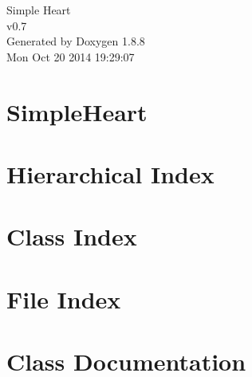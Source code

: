\documentclass[twoside]{book}
\newcommand{\+}{\discretionary{\mbox{\scriptsize$\hookleftarrow$}}{}{}}
\newcommand{\clearemptydoublepage}{%
  \newpage{\pagestyle{empty}\cleardoublepage}%
}
\begin{document}
\hypersetup{pageanchor=false,
             bookmarks=true,
             bookmarksnumbered=true,
             pdfencoding=unicode
            }
\begin{titlepage}
\vspace*{7cm}
\begin{center}%
{\Large Simple Heart \\[1ex]\large v0.\+7 }\\
\vspace*{1cm}
{\large Generated by Doxygen 1.8.8}\\
\vspace*{0.5cm}
{\small Mon Oct 20 2014 19:29:07}\\
\end{center}
\end{titlepage}
\clearemptydoublepage
\tableofcontents
\clearemptydoublepage
{}
\hypersetup{pageanchor=true}

\chapter{Simple\+Heart}
\label{md__r_e_a_d_m_e}
\hypertarget{md__r_e_a_d_m_e}{}

\chapter{Hierarchical Index}

\chapter{Class Index}

\chapter{File Index}

\chapter{Class Documentation}


































\end{document}
